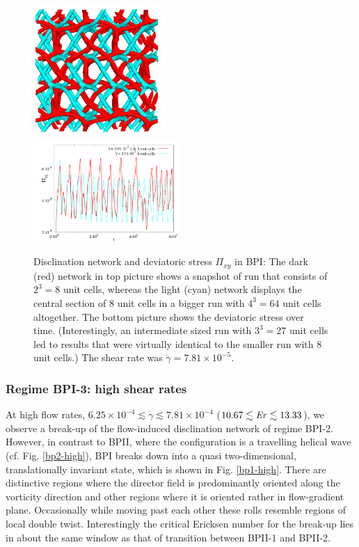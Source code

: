 \documentclass[aps,pre,reprint,superscriptaddress, twocolumn]{revtex4}
\newcommand{\e}[1]{\times10^{#1}}
\newcommand{\gd}{\dot{\gamma}}
\begin{document}
\begin{figure}[htpb]
\includegraphics[width=0.43\textwidth]{disc+y-600k-run911_run1163.png}\\
\includegraphics[width=0.495\textwidth]{stress_bp1_2uc_4uc.pdf}
\caption{Disclination network and deviatoric stress $\Pi_{xy}$ in BPI: 
The dark (red) network in top picture shows a snapshot of run that consists 
of $2^3=8$ unit cells, whereas the light (cyan) network displays the 
central section of 8 unit cells in a bigger run with $4^3=64$ unit cells altogether. 
The bottom picture shows the deviatoric stress over time. (Interestingly, 
an intermediate sized run with $3^3=27$ unit cells led to results that 
were virtually identical to the smaller run with 8 unit cells.) 
The shear rate was $\gd=7.81\e{-5}$.
}
\label{bp1-2uc4uc}
\end{figure}

\subsubsection{Regime BPI-3: high shear rates}

At high flow rates, $6.25\e{-4}\lesssim\gd\lesssim7.81\e{-4}$ ($10.67\lesssim {\it Er}\lesssim 13.33$), 
we observe a break-up of the flow-induced 
disclination network of regime BPI-2. However, 
in contrast to BPII, where the configuration is a travelling helical 
wave (cf. Fig. \ref{bp2-high}), BPI breaks down into a quasi 
two-dimensional, translationally invariant state, which is shown in 
Fig. \ref{bp1-high}. 
There are distinctive regions where the director field is 
predominantly oriented along the vorticity direction and 
other regions where it is oriented rather in flow-gradient plane. 
Occasionally while moving past each other these rolls resemble 
regions of local double twist.
Interestingly the critical Ericksen number for the break-up lies in 
about the same window as that of transition between BPII-1 and BPII-2. 
\end{document}
